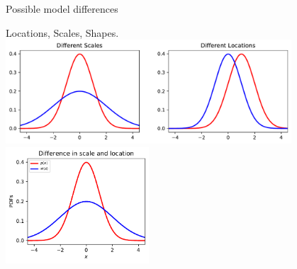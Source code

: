 
\begin{frame}{Possible model differences}

Locations, Scales, Shapes.
\centering
	\includegraphics[width=0.8\textwidth]{../../figs/2GaussianPDFs2Scales2Locations.pdf}
	\includegraphics[width=0.4\textwidth]{../../figs/pdfs_diff_scale_and_loc.pdf}
\end{frame}


